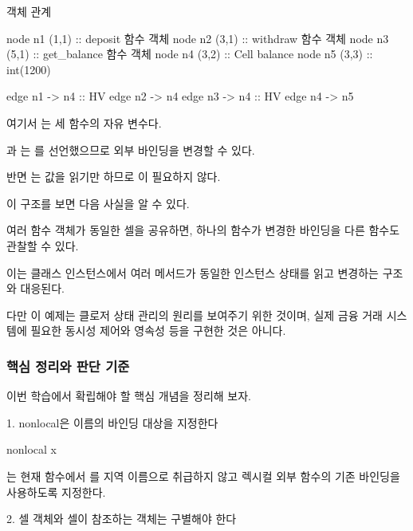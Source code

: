 \begin{dhknote}
\begin{dhksmry}[centered]
객체 관계
\end{dhksmry}
\end{dhknote}

\begin{dhkdiagram}[in=6]
node n1 (1,1) :: deposit 함수 객체
node n2 (3,1) :: withdraw 함수 객체
node n3 (5,1) :: get_balance 함수 객체
node n4 (3,2) :: Cell balance
node n5 (3,3) :: int(1200)

edge n1 -> n4 :: HV
edge n2 -> n4
edge n3 -> n4 :: HV
edge n4 -> n5
\end{dhkdiagram}

여기서 는 세 함수의 자유 변수다.

과 는 를 선언했으므로 외부 바인딩을 변경할 수 있다.

반면 는 값을 읽기만 하므로 이 필요하지 않다.

이 구조를 보면 다음 사실을 알 수 있다.

여러 함수 객체가 동일한 셀을 공유하면, 하나의 함수가 변경한 바인딩을 다른 함수도 관찰할 수 있다.

이는 클래스 인스턴스에서 여러 메서드가 동일한 인스턴스 상태를 읽고 변경하는 구조와 대응된다.

다만 이 예제는 클로저 상태 관리의 원리를 보여주기 위한 것이며, 실제 금융 거래 시스템에 필요한 동시성 제어와 영속성 등을 구현한 것은 아니다.

\subsubsection{핵심 정리와 판단 기준}

이번 학습에서 확립해야 할 핵심 개념을 정리해 보자.

\begin{dhknote}
\begin{dhksmry}[centered]
1. nonlocal은 이름의 바인딩 대상을 지정한다
\end{dhksmry}
\end{dhknote}

\begin{dhkcode}
nonlocal x
\end{dhkcode}

는 현재 함수에서 를 지역 이름으로 취급하지 않고 렉시컬 외부 함수의 기존 바인딩을 사용하도록 지정한다.

\begin{dhknote}
\begin{dhksmry}[centered]
2. 셀 객체와 셀이 참조하는 객체는 구별해야 한다
\end{dhksmry}
\end{dhknote}

